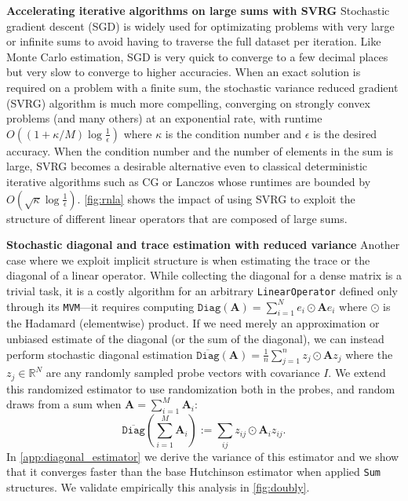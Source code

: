 \documentclass{article}
\newcommand{\mbf}[1]{{\boldsymbol{\mathbf{#1}}}}
\renewcommand{\bm}{\mbf}
\newcommand{\tsum}{\textstyle{\sum}}
\begin{document}
\textbf{Accelerating iterative algorithms on large sums with SVRG} \quad
Stochastic gradient descent (SGD) is widely used for optimizating problems with very large or infinite sums to avoid having to traverse the full dataset per iteration.
Like Monte Carlo estimation, SGD is very quick to converge to a few decimal places but very slow to converge to higher accuracies.
When an exact solution is required on a problem with a finite sum, the stochastic variance reduced gradient (SVRG) algorithm \citep{johnson2013accelerating} is much more compelling, converging on strongly convex problems (and many others) at an exponential rate, with runtime $O((1+\kappa/M)\log \tfrac{1}{\epsilon})$ where $\kappa$ is the condition number and $\epsilon$ is the desired accuracy. When the condition number and the number of elements in the sum is large, SVRG becomes a desirable alternative even to classical deterministic iterative algorithms
such as CG or Lanczos whose runtimes are bounded by $O(\sqrt{\kappa} \log \tfrac{1}{\epsilon})$.
\autoref{fig:rnla} shows the impact of using SVRG to exploit the structure of different linear operators that are composed of large sums.

\textbf{Stochastic diagonal and trace estimation with reduced variance} \quad
Another case where we exploit implicit structure is when estimating the trace or the diagonal of a linear operator.
While collecting the diagonal for a dense matrix is a trivial task, it is a costly algorithm for an arbitrary \texttt{LinearOperator} defined only through its \texttt{MVM}---it requires computing $\texttt{Diag}(\bm A) = \sum_{i=1}^N e_i \odot \bm A e_i$ where $\odot$ is the Hadamard (elementwise) product.
If we need merely an approximation or unbiased estimate of the diagonal (or the sum of the diagonal), we can instead perform stochastic diagonal estimation \citep{hutchinson1989stochastic}
$\overline{\texttt{Diag}}(\bm A) = \frac{1}{n}\sum_{j=1}^n z_j\odot \bm A z_j$ where the $z_j \in \mathbb{R}^N$ are any randomly sampled probe vectors with covariance $I$.
We extend this randomized estimator to use randomization both in the probes, and random draws from a sum when $\bm A = \sum_{i=1}^M\bm A_i$:
\begin{equation*}
    \overline{\texttt{Diag}}\left(\tsum_{i=1}^M \bm A_i\right) := \tsum_{ij}z_{ij}\odot \bm A_i z_{ij}.
\end{equation*}
In \autoref{app:diagonal_estimator} we derive the variance of this estimator and we show that it converges faster than the base Hutchinson estimator when applied \texttt{Sum} structures. We validate empirically this analysis in \autoref{fig:doubly}.
\end{document}
